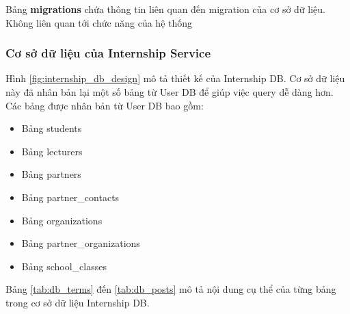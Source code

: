 \documentclass[./../main.tex]{subfiles}
\begin{document}
Bảng \textbf{migrations} chứa thông tin liên quan đến migration của cơ sở dữ liệu. Không liên quan tới chức năng của hệ thống

\subsubsection{Cơ sở dữ liệu của Internship Service}

Hình \ref{fig:internship_db_design} mô tả thiết kế của Internship DB. Cơ sở dữ liệu này đã nhân bản lại một số bảng từ User DB để giúp việc query dễ dàng hơn. Các bảng được nhân bản từ User DB bao gồm:

\begin{itemize}
\item
  
  Bảng students
  
\item
  
  Bảng lecturers
  
\item
  
  Bảng partners
  
\item
  
  Bảng partner\_contacts
  
\item
  
  Bảng organizations
  
\item
  
  Bảng partner\_organizations
  
\item
  
  Bảng school\_classes
  
\end{itemize}

Bảng \ref{tab:db_terms} đến \ref{tab:db_posts} mô tả nội dung cụ thể của từng bảng trong cơ sở dữ liệu Internship DB.
\end{document}
